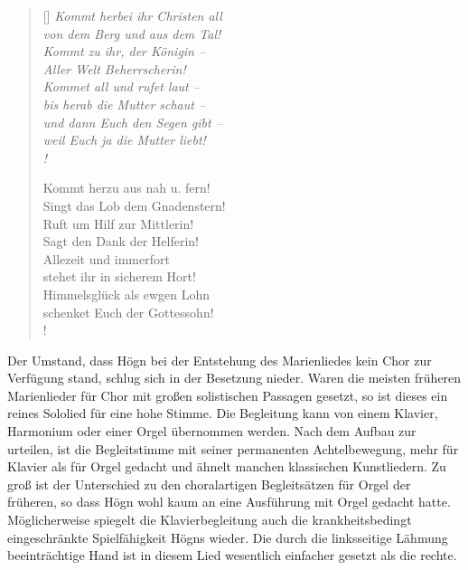 \documentclass{book}
\begin{document}
\begin{verse}[\versewidth]
\itshape
Kommt herbei ihr Christen all \\
von dem Berg und aus dem Tal! \\
Kommt zu ihr, der Königin – \\
Aller Welt Beherrscherin!\\
Kommet all und rufet laut – \\
bis herab die Mutter schaut – \\
und dann Euch den Segen gibt – \\
weil Euch ja die Mutter liebt! \\!

Kommt herzu aus nah u. fern! \\
Singt das Lob dem Gnadenstern! \\
Ruft um Hilf zur Mittlerin! \\
Sagt den Dank der Helferin! \\
Allezeit und immerfort \\
stehet ihr in sicherem Hort! \\
Himmelsglück als ewgen Lohn \\
schenket Euch der Gottessohn! \\!
\end{verse}

Der Umstand, dass Högn bei der Entstehung des Marienliedes kein Chor zur
Verfügung stand, schlug sich in der Besetzung nieder. Waren die meisten
früheren Marienlieder für Chor mit großen solistischen Passagen
gesetzt, so ist dieses ein reines Sololied für eine hohe Stimme. Die
Begleitung kann von einem Klavier, Harmonium oder einer Orgel
übernommen werden. Nach dem Aufbau zur urteilen, ist die Begleitstimme
mit seiner permanenten Achtelbe\-wegung, mehr für Klavier als für Orgel
gedacht und ähnelt manchen klassi\-schen Kunstliedern. Zu groß ist der
Unterschied zu den choralartigen Begleit\-sätzen für Orgel der
früheren, so dass Högn wohl kaum an eine Ausführung mit Orgel gedacht
hatte. Möglicherweise spiegelt die Klavierbegleitung auch die
krankheitsbedingt eingeschränkte Spielfähigkeit Högns wieder. Die durch
die linksseitige Lähmung beeinträchtige Hand ist in diesem Lied
wesentlich ein\-facher gesetzt als die rechte.

\end{document}
